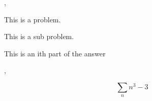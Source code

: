 \documentclass{article}
\begin{document}
\maketitle

\begin{problem}

    \prdescription{\lipsum[66]}
    \sep

    This is a problem. \lipsum[66]

    \begin{subproblem}
        This is a sub problem. \lipsum[66]

        \begin{ipart}
            This is an ith part of the answer
        \end{ipart}

        \begin{ipart}
            \lipsum[66]
        \end{ipart}
        \sep

        \lipsum[66]

    \end{subproblem}

    \begin{subproblem}
        \lipsum[11]

        \[
        \sum_n {n^3 - 3}
        \]

    \end{subproblem}

    \lipsum[77]

\end{problem}
\end{document}

